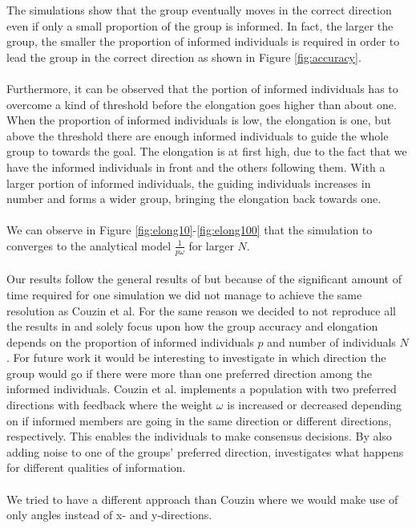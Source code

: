 The simulations show that the group eventually moves in the correct direction even if only a small proportion of the group is informed. 
In fact, the larger the group, the smaller the proportion of informed individuals is required in order to lead the group in the correct direction as shown in Figure \ref{fig:accuracy}.
\\\\
Furthermore, it can be observed that the portion of informed individuals has to overcome a kind of threshold before the elongation goes higher than about one. 
When the proportion of informed individuals is low, the elongation is one, but above the threshold there are enough informed individuals to guide the whole group to towards the goal. 
The elongation is at first high, due to the fact that we have the informed individuals in front and the others following them. 
With a larger portion of informed individuals, the guiding individuals increases in number and forms a wider group, bringing the elongation back towards one.
\\\\
We can observe in Figure \ref{fig:elong10}-\ref{fig:elong100} that the simulation to converges to the analytical model $\frac{1}{p\omega}$ for larger $N$.
\\\\
Our results follow the general results of \cite{theArticle} but because of the significant amount of time required for one simulation we did not manage to achieve the same resolution as Couzin et al. For the same reason we decided to not reproduce all the results in \cite{theArticle} and solely focus upon how the group accuracy and elongation depends on the proportion of informed individuals $p$ and number of individuals $N$. For future work it would be interesting to investigate in which direction the group would go if there were more than one preferred direction among the informed individuals. Couzin et al. implements a population with two preferred directions with feedback where the weight $\omega$ is increased or decreased depending on if informed members are going in the same direction or different directions, respectively. This enables the individuals to make consensus decisions. By also adding noise to one of the groups' preferred direction, \cite{theArticle} investigates what happens for different qualities of information.
\\\\
We tried to have a different approach than Couzin where we would make use of only angles instead of x- and y-directions. 
